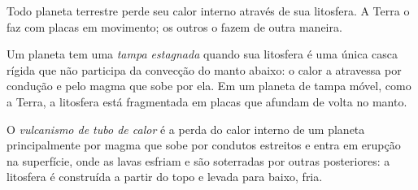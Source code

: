 Todo planeta terrestre perde seu calor interno através de sua litosfera.
A Terra o faz com placas em movimento; os outros o fazem de outra maneira.

\begin{definition}\label{def:b3:planetary-interiors-surfaces:stagnant-lid}
Um planeta tem uma \emph{tampa estagnada} quando sua litosfera
é uma única casca rígida que não participa da convecção do
manto abaixo: o calor a atravessa por condução e pelo magma que sobe por ela.
Em um planeta de tampa móvel, como a Terra, a litosfera está
fragmentada em placas que afundam de volta no manto.
\end{definition}

\begin{definition}\label{def:b3:planetary-interiors-surfaces:heat-pipe}
O \emph{vulcanismo de tubo de calor} é a perda do
calor interno de um planeta principalmente por magma que sobe por condutos estreitos
e entra em erupção na superfície, onde as lavas esfriam e são soterradas por outras
posteriores: a litosfera é construída a partir do topo e levada para baixo, fria.
\end{definition}

